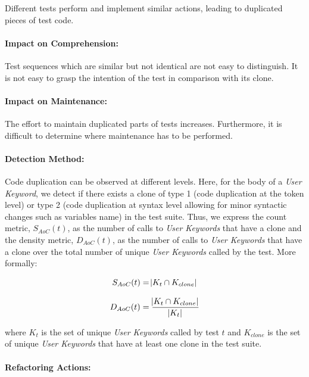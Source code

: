 Different tests perform and implement similar actions, leading to duplicated pieces of test code.

\paragraph{Impact on Comprehension:} 

Test sequences which are similar but not identical are not easy to distinguish. It is not easy to grasp the intention of the test in comparison with its clone.

\paragraph{Impact on Maintenance:} 

The effort to maintain duplicated parts of tests increases. Furthermore, it is difficult to determine where maintenance has to be performed.

\paragraph{Detection Method:}

Code duplication can be observed at different levels. Here, for the body of a \emph{User Keyword}, we detect if there exists a clone of type 1 (code duplication at the token level) or type 2 (code duplication at syntax level allowing for minor syntactic changes such as variables name) in the test suite. Thus, we express the count metric, $S_{AoC}(t)$, as the number of calls to \emph{User Keywords} that have a clone and the density metric, $D_{AoC}(t)$, as the number of calls to \emph{User Keywords} that have a clone over the total number of unique \emph{User Keywords} called by the test. More formally:

\begin{equation*}
    S_{AoC}(t) = \abs{K_t \cap K_{clone}} 
\end{equation*}

\begin{equation*}
    D_{AoC}(t) = \frac{\abs{K_t \cap K_{clone}}}{\abs{K_{t}}}
\end{equation*}

where $K_{t}$ is the set of unique \emph{User Keywords} called by test $t$ and $K_{clone}$ is the set of unique \emph{User Keywords} that have at least one clone in the test suite.

\paragraph{Refactoring Actions:}

